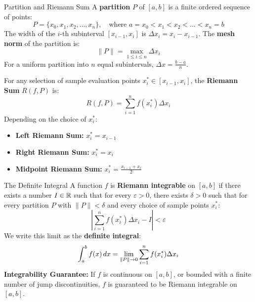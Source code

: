 \begin{definitionbox}{Partition and Riemann Sum}
A \textbf{partition} $P$ of $[a, b]$ is a finite ordered sequence of points:
\begin{equation}
P = \{x_0, x_1, x_2, \dots, x_n\}, \quad \text{where } a = x_0 < x_1 < x_2 < \dots < x_n = b
\end{equation}
The width of the $i$-th subinterval $[x_{i-1}, x_i]$ is $\Delta x_i = x_i - x_{i-1}$. The \textbf{mesh norm} of the partition is:
\begin{equation}
\|P\| = \max_{1 \le i \le n} \Delta x_i
\end{equation}
For a uniform partition into $n$ equal subintervals, $\Delta x = \frac{b - a}{n}$.

For any selection of sample evaluation points $x_i^* \in [x_{i-1}, x_i]$, the \textbf{Riemann Sum} $R(f, P)$ is:
\begin{equation}
R(f, P) = \sum_{i=1}^n f(x_i^*) \Delta x_i
\end{equation}
Depending on the choice of $x_i^*$:
\begin{itemize}
    \item \textbf{Left Riemann Sum:} $x_i^* = x_{i-1}$
    \item \textbf{Right Riemann Sum:} $x_i^* = x_i$
    \item \textbf{Midpoint Riemann Sum:} $x_i^* = \frac{x_{i-1} + x_i}{2}$
\end{itemize}
\end{definitionbox}

\begin{definitionbox}{The Definite Integral}
A function $f$ is \textbf{Riemann integrable} on $[a, b]$ if there exists a number $I \in \mathbb{R}$ such that for every $\varepsilon > 0$, there exists $\delta > 0$ such that for every partition $P$ with $\|P\| < \delta$ and every choice of sample points $x_i^*$:
\begin{equation}
\left| \sum_{i=1}^n f(x_i^*) \Delta x_i - I \right| < \varepsilon
\end{equation}
We write this limit as the \textbf{definite integral}:
\begin{equation}
\int_a^b f(x) \,dx = \lim_{\|P\| \to 0} \sum_{i=1}^n f(x_i^*) \Delta x_i
\end{equation}
\textbf{Integrability Guarantee:} If $f$ is continuous on $[a, b]$, or bounded with a finite number of jump discontinuities, $f$ is guaranteed to be Riemann integrable on $[a, b]$.
\end{definitionbox}

